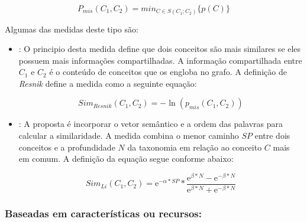 	\begin{equation}
		P_{mis}(C_1, C_2) = min_{C \in S(C_1;C_2)} \{p(C)\}
	\label{eq:mis}
	\end{equation}

Algumas das medidas deste tipo são:

\begin{itemize}

	\item{\textbf{\cite{Resnik:1999}}: O principio desta medida define que dois conceitos são mais similares se eles possuem mais informações compartilhadas. A informação compartilhada entre $C_1$ e $C_2$ é o conteúdo de conceitos que os engloba no grafo. A definição de \textit{Resnik} define a medida como a seguinte equação:
	
	\begin{equation}
		Sim_{Resnik}(C_1, C_2) = - \ln (p_{mis}(C_1, C_2))
	\label{eq:resnik}
	\end{equation}}
	
	\item{\textbf{\cite{Lin1993PrincipleBasedPW}}: A proposta é incorporar o vetor semântico e a ordem das palavras para calcular a similaridade. A medida combina o menor caminho $SP$ entre dois conceitos e a profundidade $N$ da taxonomia em relação ao conceito $C$ mais em comum. A definição da equação segue conforme abaixo:

	\begin{equation}
		Sim_{Li}(C_1, C_2) = \mathrm{e}^{-\alpha * SP} * \frac{ \mathrm{e}^{\beta * N} - \mathrm{e}^{- \beta * N} }{ \mathrm{e}^{\beta * N} + \mathrm{e}^{- \beta * N} }
	\label{eq:li}
	\end{equation}}
\end{itemize}

\subsubsection{Baseadas em características ou recursos:}

